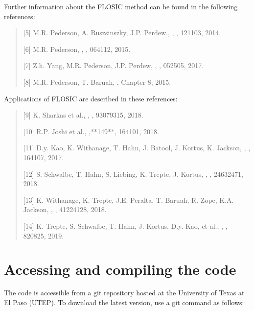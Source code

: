 \documentclass[letterpaper,10pt,english,openany,oneside]{sphinxmanual}
\begin{document}
\sphinxAtStartPar
Further information about the FLO\sphinxhyphen{}SIC method can be found in the following references:
\begin{quote}

\sphinxAtStartPar
{[}5{]} M.R. Pederson, A. Ruszsinszky, J.P. Perdew., , , 121103, 2014.

\sphinxAtStartPar
{[}6{]} M.R. Pederson, , , 064112, 2015.

\sphinxAtStartPar
{[}7{]} Z.\sphinxhyphen{}h. Yang, M.R. Pederson, J.P. Perdew, , , 052505, 2017.

\sphinxAtStartPar
{[}8{]} M.R. Pederson, T. Baruah, , Chapter 8, 2015.
\end{quote}

\sphinxAtStartPar
Applications of FLO\sphinxhyphen{}SIC are described in these references:
\begin{quote}

\sphinxAtStartPar
{[}9{]} K. Sharkas et al., , , 9307\sphinxhyphen{}9315, 2018.

\sphinxAtStartPar
{[}10{]} R.P. Joshi et al., ,**149**, 164101, 2018.

\sphinxAtStartPar
{[}11{]} D.\sphinxhyphen{}y. Kao, K. Withanage, T. Hahn, J. Batool, J. Kortus, K. Jackson, , , 164107, 2017.

\sphinxAtStartPar
{[}12{]} S. Schwalbe, T. Hahn, S. Liebing, K. Trepte, J. Kortus, , , 2463\sphinxhyphen{}2471, 2018.

\sphinxAtStartPar
{[}13{]} K. Withanage, K. Trepte, J.E. Peralta, T. Baruah, R. Zope, K.A. Jackson, , , 4122\sphinxhyphen{}4128, 2018.

\sphinxAtStartPar
{[}14{]} K. Trepte, S. Schwalbe, T. Hahn, J. Kortus, D.\sphinxhyphen{}y. Kao, et al., , , 820\sphinxhyphen{}825, 2019.
\end{quote}


\chapter{Accessing and compiling the code}
\label{\detokenize{docs/setupcode:accessing-and-compiling-the-code}}\label{\detokenize{docs/setupcode::doc}}
\sphinxAtStartPar
The code is accessible from a git repository hosted at the University of Texas at El Paso (UTEP).
To download the latest version, use a git command as follows:
\end{document}
